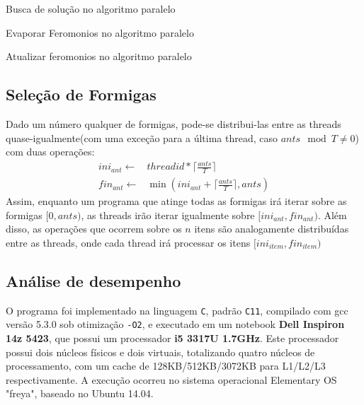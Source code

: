 \begin{algorithm}[htb]
	\caption{Busca de solução no algoritmo paralelo}
	\label{algbuscaSol}
\end{algorithm}
\begin{algorithm}[htb]
	\caption{Evaporar Feromonios no algoritmo paralelo}
	\label{algevapPher}
\end{algorithm}
\begin{algorithm}[htb]
	\caption{Atualizar feromonios no algoritmo paralelo}
	\label{algupdPher}
\end{algorithm}

\subsection{Seleção de Formigas}
Dado um número qualquer de formigas, pode-se distribui-las entre as threads quase-igualmente(com uma exceção para a última thread, caso $ants\mod T \neq 0$) com duas operações:
\begin{align}
ini_{ant} \gets &threadid * \lceil\frac{ants}{T}\rceil\nonumber\\
fin_{ant} \gets &\min(ini_{ant} + \lceil\frac{ants}{T}\rceil, ants)\nonumber
\end{align}
Assim, enquanto um programa que atinge todas as formigas irá iterar sobre as formigas $[0,ants)$, as threads irão iterar igualmente sobre $[ini_{ant}, fin_{ant})$. Além disso, as operações que ocorrem sobre os $n$ itens são analogamente distribuídas entre as threads, onde cada thread irá processar os itens $[ini_{item}, fin_{item})$

\subsection{Análise de desempenho}
O programa foi implementado na linguagem \texttt{C}, padrão \texttt{C11}, compilado com gcc versão 5.3.0 sob otimização \texttt{-O2}, e executado em um notebook \textbf{Dell Inspiron 14z 5423}, que possui um processador \textbf{i5 3317U 1.7GHz}. Este processador possui dois núcleos físicos e dois virtuais, totalizando quatro núcleos de processamento, com um cache de 128KB/512KB/3072KB para L1/L2/L3 respectivamente. A execução ocorreu no sistema operacional Elementary OS "freya", baseado no Ubuntu 14.04.

